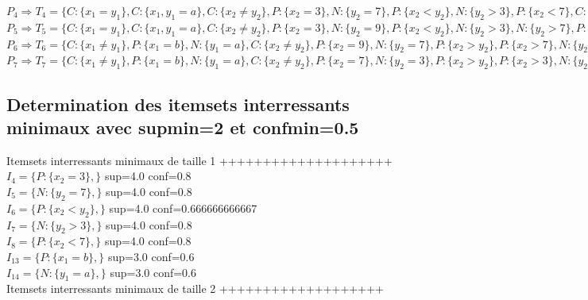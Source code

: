 \documentclass[a4paper,12pt,openany,oneside]{article}
\begin{document}
        \noindent $P_{4}\Rightarrow T_{4}=\{C:\{x_{1}=y_{1}\},C:\{x_{1},y_{1}=a\},C:\{x_{2}\neq y_{2}\},P:\{x_{2}=3\},N:\{y_{2}=7\},P:\{x_{2}<y_{2}\},N:\{y_{2}>3\},P:\{x_{2}<7\},C:\{x_{2},y_{2}<9\},\}$ \\
        
        \noindent $P_{5}\Rightarrow T_{5}=\{C:\{x_{1}=y_{1}\},C:\{x_{1},y_{1}=a\},C:\{x_{2}\neq y_{2}\},P:\{x_{2}=3\},N:\{y_{2}=9\},P:\{x_{2}<y_{2}\},N:\{y_{2}>3\},N:\{y_{2}>7\},P:\{x_{2}<7\},P:\{x_{2}<9\},\}$ \\
        
        \noindent $P_{6}\Rightarrow T_{6}=\{C:\{x_{1}\neq y_{1}\},P:\{x_{1}=b\},N:\{y_{1}=a\},C:\{x_{2}\neq y_{2}\},P:\{x_{2}=9\},N:\{y_{2}=7\},P:\{x_{2}>y_{2}\},P:\{x_{2}>7\},N:\{y_{2}<9\},C:\{x_{2},y_{2}>3\},\}$ \\
        
        \noindent $P_{7}\Rightarrow T_{7}=\{C:\{x_{1}\neq y_{1}\},P:\{x_{1}=b\},N:\{y_{1}=a\},C:\{x_{2}\neq y_{2}\},P:\{x_{2}=7\},N:\{y_{2}=3\},P:\{x_{2}>y_{2}\},P:\{x_{2}>3\},N:\{y_{2}<7\},C:\{x_{2},y_{2}<9\},\}$ \\
        
        
       \newpage
       
        \subsection{Determination des itemsets interressants minimaux avec supmin=2 et confmin=0.5}
        
        Itemsets interressants minimaux de taille 1 ++++++++++++++++++++\\
        
        $I_{4}=\{P:\{x_{2}=3\},\}$  sup=4.0 conf=0.8\\
        $I_{5}=\{N:\{y_{2}=7\},\}$  sup=4.0 conf=0.8\\
        $I_{6}=\{P:\{x_{2}<y_{2}\},\}$  sup=4.0 conf=0.666666666667\\
        $I_{7}=\{N:\{y_{2}>3\},\}$  sup=4.0 conf=0.8\\
        $I_{8}=\{P:\{x_{2}<7\},\}$  sup=4.0 conf=0.8\\
        $I_{13}=\{P:\{x_{1}=b\},\}$  sup=3.0 conf=0.6\\
        $I_{14}=\{N:\{y_{1}=a\},\}$  sup=3.0 conf=0.6\\
        
        Itemsets interressants minimaux de taille 2 +++++++++++++++++++\\
        
\end{document}
